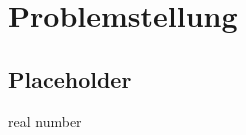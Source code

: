 
\chapter{Problemstellung} \label{ch:problemstellung}

\section{Placeholder}
\lipsum \gls{real number} 